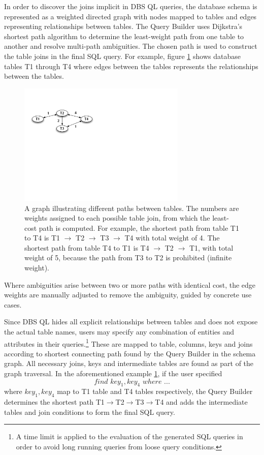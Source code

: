 \documentclass[a4paper]{jpconf}
\begin{document}
In order to discover the joins implicit in DBS QL queries,
the database schema is represented as a weighted
directed graph with nodes mapped to tables and edges 
representing relationships between tables\cite{GraphTool}.
The Query Builder
uses Dijkstra’s shortest path algorithm to determine the least-weight 
path from one table to another and resolve multi-path ambiguities.
The chosen path is used to construct the table joins in the final SQL query. 
For example, figure \ref{ShortestPath} shows database tables 
T1 through T4 where edges between the tables represents the 
relationships between the tables.

\begin{figure}[htb]
\centering
\includegraphics[width=80mm]{DBSSql_shortestpath.pdf}
\caption{A graph illustrating different paths between tables. The
numbers are weights assigned to each possible table join, from which the least-cost path
is computed. For example, the shortest path from table T1 to T4 is 
T1 $\rightarrow$ T2 $\rightarrow$ T3 $\rightarrow$ T4 with total weight 
of 4.  The shortest path from table T4 to T1 is 
T4 $\rightarrow$ T2 $\rightarrow$ T1, with total weight of 5, because the path
from T3 to T2 is prohibited (infinite weight).
}
\label{ShortestPath}
\end{figure}
Where ambiguities arise between two or more paths
with identical cost, the edge weights are manually adjusted to remove the
ambiguity, guided by concrete use cases. 

Since DBS QL hides all explicit relationships between tables and does not
expose the actual table names, users may
specify any combination of entities and attributes in their queries.\footnote{
A time limit is applied to the evaluation of the generated SQL queries
in order to avoid long running queries from loose query conditions.}
These are mapped to table, columns, keys and joins according to
shortest connecting path found by the Query Builder in the schema graph.
All necessary joins, keys and intermediate tables are found as part of the
graph traversal.
In the aforementioned example \ref{ShortestPath},
if the user specified
$$find\,\, key_1, key_4\,\, where\,\, ...$$
where $key_1, key_4$ map to T1 table and T4 tables respectively,
the Query Builder determines
the shortest path 
T1$\rightarrow$T2$\rightarrow$T3$\rightarrow$T4 
and adds the intermediate tables 
and join conditions to form the final SQL query. 
\end{document}
